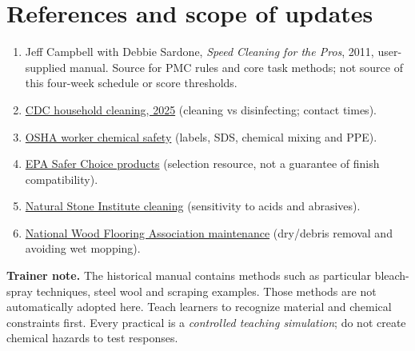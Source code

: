\documentclass[10pt,letterpaper,oneside]{article}
\newcommand{\refurl}[2]{\href{#2}{#1}}
\begin{document}
\section{References and scope of updates}
\begin{enumerate}
\item Jeff Campbell with Debbie Sardone, \emph{Speed Cleaning for the Pros}, 2011, user-supplied manual. Source for PMC rules and core task methods; not source of this four-week schedule or score thresholds.
\item \refurl{CDC household cleaning, 2025}{https://www.cdc.gov/hygiene/about/when-and-how-to-clean-and-disinfect-your-home.html} (cleaning vs disinfecting; contact times).
\item \refurl{OSHA worker chemical safety}{https://www.osha.gov/sites/default/files/publications/OSHA3512.pdf} (labels, SDS, chemical mixing and PPE).
\item \refurl{EPA Safer Choice products}{https://www.epa.gov/saferchoice/products} (selection resource, not a guarantee of finish compatibility).
\item \refurl{Natural Stone Institute cleaning}{https://www.naturalstoneinstitute.org/consumers/care/} (sensitivity to acids and abrasives).
\item \refurl{National Wood Flooring Association maintenance}{https://woodfloors.org/maintenance/} (dry/debris removal and avoiding wet mopping).
\end{enumerate}
\begin{notebox}\textbf{Trainer note.} The historical manual contains methods such as particular bleach-spray techniques, steel wool and scraping examples. Those methods are not automatically adopted here. Teach learners to recognize material and chemical constraints first. Every practical is a \emph{controlled teaching simulation}; do not create chemical hazards to test responses.\end{notebox}
\end{document}
